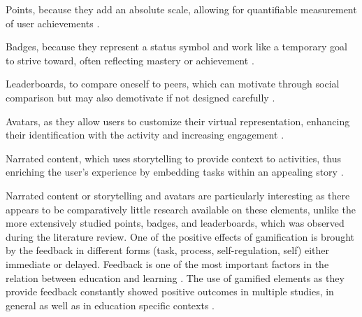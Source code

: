\begin{APAitemize}
    \item Points, because they add an absolute scale, allowing for quantifiable measurement of user achievements \parencite{hamariDoesGamificationWork2014}.
    \item Badges, because they represent a status symbol and work like a temporary goal to strive toward, often reflecting mastery or achievement \parencite{gonzalezGamificationIntelligentTutoring2014}.
    \item Leaderboards, to compare oneself to peers, which can motivate through social comparison but may also demotivate if not designed carefully \parencite{hamariDoesGamificationWork2014, almeidaSystematicMappingNegative2021}.
    \item Avatars, as they allow users to customize their virtual representation, enhancing their identification with the activity and increasing engagement \parencite{gonzalezGamificationIntelligentTutoring2014}.
    \item Narrated content, which uses storytelling to provide context to activities, thus enriching the user's experience by embedding tasks within an appealing story \parencite{gonzalezGamificationIntelligentTutoring2014}.
\end{APAitemize}
Narrated content or storytelling and avatars are particularly interesting as there appears to be comparatively little research available on these elements, unlike the more extensively studied points, badges, and leaderboards, which was observed during the literature review.
One of the positive effects of gamification is brought by the feedback in different forms (task, process, self-regulation, self) either immediate or delayed.
Feedback is one of the most important factors in the relation between education and learning \parencite{sailerGamificationLearningMetaanalysis2020}.
The use of gamified elements as they provide feedback constantly \parencite{wouters} showed positive outcomes in multiple studies, in general \parencite{hamariDoesGamificationWork2014} as well as in education specific contexts \parencite{sailerGamificationLearningMetaanalysis2020}.


